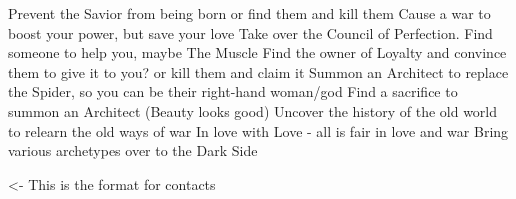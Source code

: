 \documentclass[char]{Silversiders}
\begin{document}
\name{\cWar{}}

Prevent the Savior from being born or find them and kill them
Cause a war to boost your power, but save your love
Take over the Council of Perfection. Find someone to help you, maybe The Muscle
Find the owner of Loyalty and convince them to give it to you? or kill them and claim it
Summon an Architect to replace the Spider, so you can be their right-hand woman/god
Find a sacrifice to summon an Architect (Beauty looks good)
Uncover the history of the old world to relearn the old ways of war
In love with Love - all is fair in love and war
Bring various archetypes over to the Dark Side

\begin{itemz}[Goals]
	\item 
\end{itemz}

\begin{itemz}[Notes]
	\item 
\end{itemz}

\begin{contacts}
	\contact{\cTest{}} <- This is the format for contacts 
\end{contacts}
\end{document}
